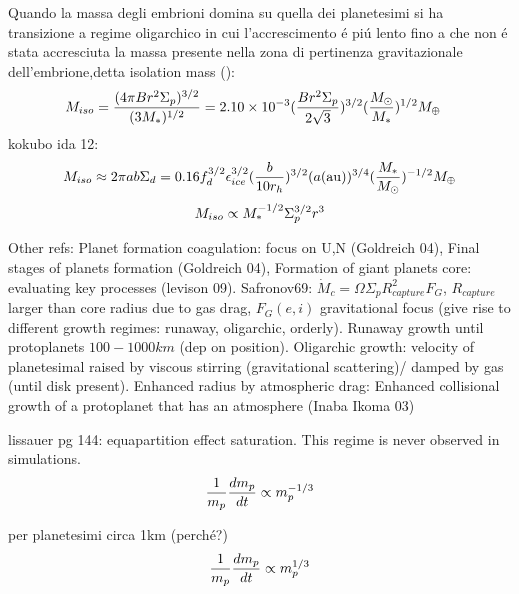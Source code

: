 \begin{workout}
	Quando la massa degli embrioni domina su quella dei planetesimi si ha transizione a regime oligarchico in cui l'accrescimento \'e pi\'u lento fino a che non \'e stata accresciuta la massa presente nella zona di pertinenza gravitazionale dell'embrione,detta isolation mass (\cite{lissauer1993planet}):
	\begin{align}
		&M_{iso}=\frac{(4\pi Br^2\Sigma_p)\expy{3/2}}{(3M_*)\expy{1/2}}=\num{2.10e-3}(\frac{Br^2\Sigma_p}{2\sqrt{3}})\expy{3/2}(\frac{\msun{}}{M_*})\expy{1/2}\mearth{}
	\end{align}
	kokubo ida 12:
	\[M_{iso}\approx2\pi ab\Sigma_d=0.16f_d\expy{3/2}\epsilon_{ice}\expy{3/2}(\frac{b}{10r_h})\expy{3/2}(a(\si{\astronomicalunit}))\expy{3/4}(\frac{M_*}{\msun{}})\expy{-1/2}\mearth{}\]
	\begin{equation}
	M_{iso}\propto M_*\expy{-1/2}\Sigma_p\expy{3/2}r^3
	\end{equation}
\end{workout}

\begin{workout}
	Other refs: Planet formation coagulation: focus on U,N (Goldreich 04), Final stages of planets formation (Goldreich 04), Formation of giant planets core: evaluating key processes (levison 09).
	Safronov69: $\dot{M}_c=\Omega\Sigma_pR^2_{capture}F_G$, $R_{capture}$ larger than core radius due to gas drag, $F_G(e,i)$ gravitational focus (give rise to different growth regimes: runaway, oligarchic, orderly).
	Runaway growth until protoplanets $100-1000km$ (dep on position).
	Oligarchic growth: velocity of planetesimal raised by viscous stirring (gravitational scattering)/ damped by gas (until disk present).
	Enhanced radius by atmospheric drag: Enhanced collisional growth of a protoplanet that has an atmosphere (Inaba Ikoma 03)
\end{workout}

\begin{workout}
	lissauer pg 144: equapartition effect saturation. This regime is never observed in simulations.
	\begin{equation}
	\frac{1}{m_p}\TDy{t}{m_p}\propto m_p\expy{-1/3}
	\end{equation}
\end{workout}

\begin{workout}
	per planetesimi circa 1km (perch\'e?)
	\begin{equation}
	\frac{1}{m_p}\TDy{t}{m_p}\propto m_p\expy{1/3}
	\end{equation}
\end{workout}


